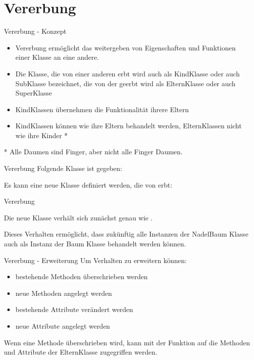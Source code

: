 \section{Vererbung}
\begin{frame}{Vererbung - Konzept}
	\begin{itemize}
		\item Vererbung ermöglicht das weitergeben von Eigenschaften und Funktionen einer Klasse an eine andere.
		\item Die Klasse, die von einer anderen erbt wird auch als \alert{KindKlasse} oder auch \alert{SubKlasse} bezeichnet, die von der geerbt wird als \alert{ElternKlasse} oder auch \alert{SuperKlasse}
		\item KindKlassen übernehmen die Funktionalität ihrere Eltern
		\item KindKlassen können wie ihre Eltern behandelt werden, ElternKlassen nicht wie ihre Kinder *
	\end{itemize}
	* Alle Daumen sind Finger, aber nicht alle Finger Daumen.
\end{frame}

\begin{frame}{Vererbung}
	Folgende Klasse ist gegeben:
	
	Es kann eine neue Klasse definiert werden, die von  erbt:
	
\end{frame}

\begin{frame}{Vererbung}
	
	Die neue Klasse  verhält sich zunächst genau wie .
	
	Dieses Verhalten ermöglicht, dass zukünftig alle Instanzen der NadelBaum Klasse auch als Instanz der Baum Klasse behandelt werden können.
\end{frame}

\begin{frame}{Vererbung - Erweiterung}
	Um Verhalten zu erweitern können:
	\begin{itemize}
		\item bestehende Methoden überschrieben werden
		\item neue Methoden angelegt werden
		\item bestehende Attribute verändert werden
		\item neue Attribute angelegt werden
	\end{itemize}
	Wenn eine Methode überschrieben wird, kann mit der  Funktion
	auf die Methoden und Attribute der ElternKlasse zugegriffen werden.
	
\end{frame}

